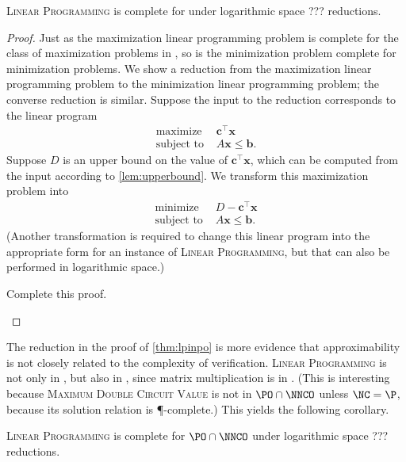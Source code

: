 \documentclass[]{article}
\begin{document}
\begin{theorem}
  \textsc{Linear Programming} is complete for \PO{} under logarithmic space ??? reductions.
\end{theorem}
\begin{proof}
  Just as the maximization linear programming problem is complete for the class of maximization problems in \PO, so is the minimization problem complete for minimization problems.
  We show a reduction from the maximization linear programming problem to the minimization linear programming problem; the converse reduction is similar.
  Suppose the input to the reduction corresponds to the linear program
  \begin{align*}
    \text{maximize } & \mathbf{c}^\intercal \mathbf{x} \\
    \text{subject to } & A \mathbf{x} \leq \mathbf{b}.
  \end{align*}
  Suppose $D$ is an upper bound on the value of $\mathbf{c}^\intercal \mathbf{x}$, which can be computed from the input according to \autoref{lem:upperbound}.
  We transform this maximization problem into
  \begin{align*}
    \text{minimize } & D - \mathbf{c}^\intercal \mathbf{x} \\
    \text{subject to } & A \mathbf{x} \leq \mathbf{b}.
  \end{align*}
  (Another transformation is required to change this linear program into the appropriate form for an instance of \textsc{Linear Programming}, but that can also be performed in logarithmic space.)

  \begin{todo}
    Complete this proof.
  \end{todo}
\end{proof}

The reduction in the proof of \autoref{thm:lpinpo} is more evidence that approximability is not closely related to the complexity of verification.
\textsc{Linear Programming} is not only in \PO, but also in \NNCO, since matrix multiplication is in \NC.
(This is interesting because \textsc{Maximum Double Circuit Value} is not in $\PO \cap \NNCO$ unless $\NC = \P$, because its solution relation is \P-complete.)
This yields the following corollary.

\begin{corollary}\label{cor:lpishard}
  \textsc{Linear Programming} is complete for $\PO \cap \NNCO$ under logarithmic space ??? reductions.
\end{corollary}
\end{document}

